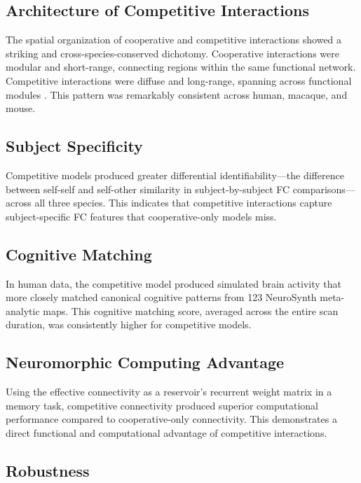\documentclass[11pt]{article}
\begin{document}
\subsection{Architecture of Competitive Interactions}

The spatial organization of cooperative and competitive interactions showed a striking and cross-species-conserved dichotomy. Cooperative interactions were modular and short-range, connecting regions within the same functional network. Competitive interactions were diffuse and long-range, spanning across functional modules \citep{deco2021rare}. This pattern was remarkably consistent across human, macaque, and mouse.

\subsection{Subject Specificity}

Competitive models produced greater differential identifiability---the difference between self-self and self-other similarity in subject-by-subject FC comparisons---across all three species. This indicates that competitive interactions capture subject-specific FC features that cooperative-only models miss.

\subsection{Cognitive Matching}

In human data, the competitive model produced simulated brain activity that more closely matched canonical cognitive patterns from 123 NeuroSynth meta-analytic maps. This cognitive matching score, averaged across the entire scan duration, was consistently higher for competitive models.

\subsection{Neuromorphic Computing Advantage}

Using the effective connectivity as a reservoir's recurrent weight matrix in a memory task, competitive connectivity produced superior computational performance compared to cooperative-only connectivity. This demonstrates a direct functional and computational advantage of competitive interactions.

\subsection{Robustness}
\end{document}
